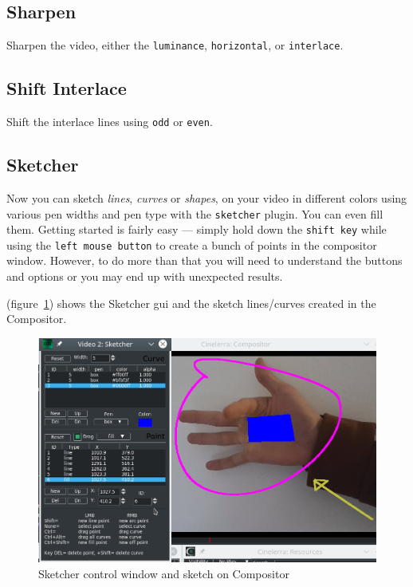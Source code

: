 \subsection{Sharpen}%
\label{sub:Sharpen}

Sharpen the video, either the \texttt{luminance}, \texttt{horizontal}, or \texttt{interlace}.

\subsection{Shift Interlace}%
\label{sub:shift_interlace}

Shift the interlace lines using \texttt{odd} or \texttt{even}.

\subsection{Sketcher}%
\label{sub:Sketcher}

Now you can sketch \textit{lines}, \textit{curves} or \textit{shapes}, on your video in different colors using various pen widths and pen type with the \texttt{sketcher} plugin. You can even fill them. Getting started is fairly easy --- simply hold down the \texttt{shift key} while using the \texttt{left mouse button} to create a bunch of points in the compositor window. However, to do more than that you will need to understand the buttons and options or you may end up with unexpected results.

(figure~\ref{fig:sketcher}) shows the Sketcher gui and the sketch lines/curves created in the Compositor.

\begin{figure}[hbtp]
    \centering
    \includegraphics[width=0.8\linewidth]{images/sketcher.png}
    \caption{Sketcher control window and sketch on Compositor}
    \label{fig:sketcher}
\end{figure}

